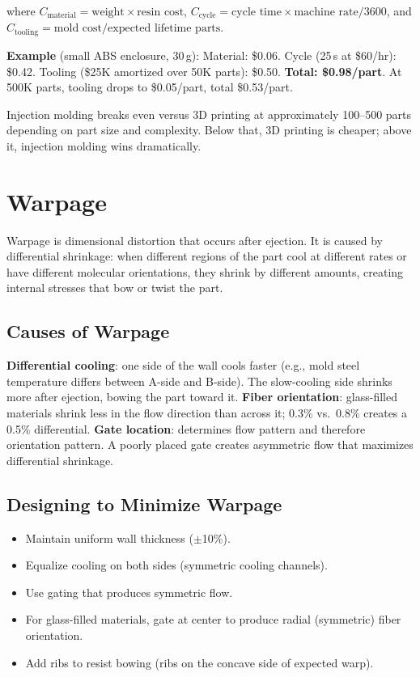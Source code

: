 \documentclass[11pt,letterpaper,twoside,openany]{book}
\begin{document}
where $C_{\text{material}} = \text{weight} \times \text{resin cost}$, $C_{\text{cycle}} = \text{cycle time} \times \text{machine rate} / 3600$, and $C_{\text{tooling}} = \text{mold cost} / \text{expected lifetime parts}$.

\textbf{Example} (small ABS enclosure, 30\,g): Material: \$0.06. Cycle (25\,s at \$60/hr): \$0.42. Tooling (\$25K amortized over 50K parts): \$0.50. \textbf{Total: \$0.98/part}. At 500K parts, tooling drops to \$0.05/part, total \$0.53/part.

Injection molding breaks even versus 3D printing at approximately 100--500 parts depending on part size and complexity. Below that, 3D printing is cheaper; above it, injection molding wins dramatically.




\section{Warpage}
Warpage is dimensional distortion that occurs after ejection. It is caused by differential shrinkage: when different regions of the part cool at different rates or have different molecular orientations, they shrink by different amounts, creating internal stresses that bow or twist the part.

\subsection{Causes of Warpage}
\textbf{Differential cooling}: one side of the wall cools faster (e.g., mold steel temperature differs between A-side and B-side). The slow-cooling side shrinks more after ejection, bowing the part toward it. \textbf{Fiber orientation}: glass-filled materials shrink less in the flow direction than across it; 0.3\% vs.\ 0.8\% creates a 0.5\% differential. \textbf{Gate location}: determines flow pattern and therefore orientation pattern. A poorly placed gate creates asymmetric flow that maximizes differential shrinkage.

\subsection{Designing to Minimize Warpage}
\begin{itemize}[nosep,leftmargin=1.5em]
\item Maintain uniform wall thickness ($\pm$10\%).
\item Equalize cooling on both sides (symmetric cooling channels).
\item Use gating that produces symmetric flow.
\item For glass-filled materials, gate at center to produce radial (symmetric) fiber orientation.
\item Add ribs to resist bowing (ribs on the concave side of expected warp).
\end{itemize}
\end{document}
